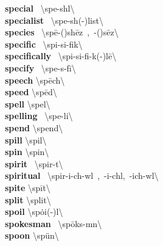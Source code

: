 \documentclass[10pt,a4paper]{article}
\begin{document}
\begin{multicols}{2}
\textbf{ special }\quad \ \textbackslash \textprimstress spe-sh\textschwa l\textbackslash \\
\textbf{ specialist }\quad \ \textbackslash \textprimstress spe-sh(\textschwa -)list\textbackslash \\
\textbf{ species }\quad \ \textbackslash \textprimstress sp\={e}-(\textsecstress )sh\={e}z\ ,\ -(\textsecstress )s\={e}z\textbackslash \\
\textbf{ specific }\quad \ \textbackslash spi-\textprimstress si-fik\textbackslash \\
\textbf{ specifically }\quad \ \textbackslash spi-\textprimstress si-fi-k(\textschwa -)l\={e}\textbackslash \\
\textbf{ specify }\quad \ \textbackslash \textprimstress spe-s\textschwa -\textsecstress f\={i}\textbackslash \\
\textbf{ speech }\quad \textbackslash \textprimstress sp\={e}ch\textbackslash \\
\textbf{ speed }\quad \textbackslash \textprimstress sp\={e}d\textbackslash \\
\textbf{ spell }\quad \textbackslash \textprimstress spel\textbackslash \\
\textbf{ spelling }\quad \ \textbackslash \textprimstress spe-li\engma \textbackslash \\
\textbf{ spend }\quad \textbackslash \textprimstress spend\textbackslash \\
\textbf{ spill }\quad \textbackslash \textprimstress spil\textbackslash \\
\textbf{ spin }\quad \textbackslash \textprimstress spin\textbackslash \\
\textbf{ spirit }\quad \ \textbackslash \textprimstress spir-\textschwa t\textbackslash \\
\textbf{ spiritual }\quad \ \textbackslash \textprimstress spir-i-ch\textschwa -w\textschwa l\ ,\ -i-ch\textschwa l,\ -ich-w\textschwa l\textbackslash \\
\textbf{ spite }\quad \textbackslash \textprimstress sp\={i}t\textbackslash \\
\textbf{ split }\quad \textbackslash \textprimstress split\textbackslash \\
\textbf{ spoil }\quad \textbackslash \textprimstress sp\.{o}i(-\textschwa )l\textbackslash \\
\textbf{ spokesman }\quad \ \textbackslash \textprimstress sp\={o}ks-m\textschwa n\textbackslash \\
\textbf{ spoon }\quad \textbackslash \textprimstress sp\"{u}n\textbackslash \\

\end{multicols}
\end{document}
